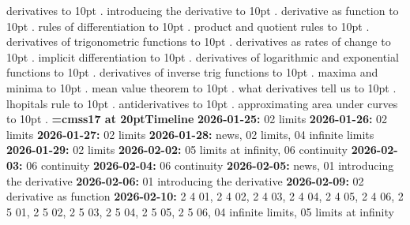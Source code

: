 \smallskip
{} derivatives \leaders\hbox to 10pt {\hss.\hss}  \hfill {}
\smallskip
{} introducing the derivative \leaders\hbox to 10pt {\hss.\hss}  \hfill {}
\smallskip
{} derivative as function \leaders\hbox to 10pt {\hss.\hss}  \hfill {}
\smallskip
{} rules of differentiation \leaders\hbox to 10pt {\hss.\hss}  \hfill {}
\smallskip
{} product and quotient rules \leaders\hbox to 10pt {\hss.\hss}  \hfill {}
\smallskip
{} derivatives of trigonometric functions \leaders\hbox to 10pt {\hss.\hss}  \hfill {}
\smallskip
{} derivatives as rates of change \leaders\hbox to 10pt {\hss.\hss}  \hfill {}
\smallskip
{} implicit differentiation \leaders\hbox to 10pt {\hss.\hss}  \hfill {}
\smallskip
{} derivatives of logarithmic and exponential functions \leaders\hbox to 10pt {\hss.\hss}  \hfill {}
\smallskip
{} derivatives of inverse trig functions \leaders\hbox to 10pt {\hss.\hss}  \hfill {}
\smallskip
{} maxima and minima \leaders\hbox to 10pt {\hss.\hss}  \hfill {}
\smallskip
{} mean value theorem \leaders\hbox to 10pt {\hss.\hss}  \hfill {}
\smallskip
{} what derivatives tell us \leaders\hbox to 10pt {\hss.\hss}  \hfill {}
\smallskip
{} lhopitals rule \leaders\hbox to 10pt {\hss.\hss}  \hfill {}
\smallskip
{} antiderivatives \leaders\hbox to 10pt {\hss.\hss}  \hfill {}
\smallskip
{} approximating area under curves \leaders\hbox to 10pt {\hss.\hss}  \hfill {}
\smallskip
\vfill \break
{\medskip\noindent\bf\font\titlefont=cmss17 at 20pt\titlefont Timeline}\medskip
{\noindent \bf 2026-01-25:} 02 limits\smallskip
{\noindent \bf 2026-01-26:} 02 limits\smallskip
{\noindent \bf 2026-01-27:} 02 limits\smallskip
{\noindent \bf 2026-01-28:} news, 02 limits, 04 infinite limits\smallskip
{\noindent \bf 2026-01-29:} 02 limits\smallskip
{\noindent \bf 2026-02-02:} 05 limits at infinity, 06 continuity\smallskip
{\noindent \bf 2026-02-03:} 06 continuity\smallskip
{\noindent \bf 2026-02-04:} 06 continuity\smallskip
{\noindent \bf 2026-02-05:} news, 01 introducing the derivative\smallskip
{\noindent \bf 2026-02-06:} 01 introducing the derivative\smallskip
{\noindent \bf 2026-02-09:} 02 derivative as function\smallskip
{\noindent \bf 2026-02-10:} 2 4 01, 2 4 02, 2 4 03, 2 4 04, 2 4 05, 2 4 06, 2 5 01, 2 5 02, 2 5 03, 2 5 04, 2 5 05, 2 5 06, 04 infinite limits, 05 limits at infinity\smallskip
